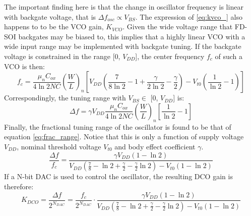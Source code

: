 		The important finding here is that the change in oscillator frequency is linear with backgate voltage, that is $\Delta f_{osc} \propto V_{BS}$. The expression of \ref{eq:kvco_} also happens to to be the VCO gain, $K_{VCO}$. Given the wide voltage range that FD-SOI backgates may be biased to, this implies that a highly linear VCO with a wide input range may be implemented with backgate tuning. If the backgate voltage is constrained in the range [0, $V_{DD}$], the center frequency $f_c$ of such a VCO is then:
		\begin{equation}
			f_{c} = \frac{\mu_nC_{ox}}{4\ln2NC}\left(\frac{W}{L}\right)_n\left[V_{DD}\left(\frac{7}{8\ln2}-1+\frac{\gamma}{2\ln2}-\frac{\gamma}{2}\right)-V_{t0}\left(\frac{1}{\ln2}-1\right)\right]
		\end{equation}
		Correspondingly, the tuning range with $V_{BS} \in$ [0, $V_{DD}$] is:
		\begin{equation}\label{eq:tuning_range}
			\Delta f = \gamma V_{DD}\frac{\mu_nC_{ox}}{4\ln2NC}\left(\frac{W}{L}\right)_n\left[\frac{1}{\ln2}-1\right]
		\end{equation}
		Finally, the fractional tuning range of the oscillator is found to be that of equation \ref{eq:frac_range}. Notice that this is only a function of supply voltage $V_{DD}$, nominal threshold voltage $V_{t0}$ and body effect coefficient $\gamma$.
		\begin{equation}\label{eq:frac_range}
			\frac{\Delta f}{f_c} = \frac{\gamma V_{DD}\left( 1-\ln2 \right)}{V_{DD}\left(\frac{7}{8}-\ln2+\frac{\gamma}{2}-\frac{\gamma}{2}\ln2\right)-V_{t0}\left(1-\ln2\right)}
		\end{equation}	
		If a N-bit DAC is used to control the oscillator, the resulting DCO gain is therefore:
		\begin{equation}
			K_{DCO} = \frac{\Delta f}{2^{N_{DAC}}} = \frac{f_c}{2^{N_{DAC}}}\cdot\frac{\gamma V_{DD}\left( 1-\ln2 \right)}{V_{DD}\left(\frac{7}{8}-\ln2+\frac{\gamma}{2}-\frac{\gamma}{2}\ln2\right)-V_{t0}\left(1-\ln2\right)}
		\end{equation}	



